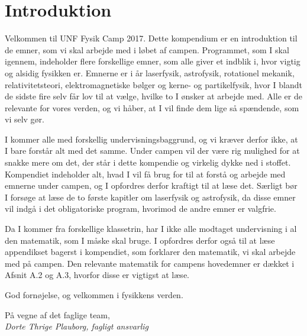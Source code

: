 \chapter{Introduktion}
\label{cha:introduktion}

Velkommen til UNF Fysik Camp 2017. Dette kompendium er en introduktion
til de emner, som vi skal arbejde med i løbet af campen. Programmet,
som I skal igennem, indeholder flere forskellige emner, som alle
giver et indblik i, hvor vigtig og alsidig fysikken er. Emnerne er i år laserfysik, astrofysik, rotationel mekanik, relativitetsteori, elektromagnetiske bølger og kerne- og partikelfysik, hvor I blandt de sidste fire selv får lov til at vælge, hvilke to I ønsker at arbejde med. Alle er de relevante for vores verden, og vi håber, at I
vil finde dem lige så spændende, som vi selv gør.

I kommer alle med forskellig undervisningsbaggrund, og vi kræver
derfor ikke, at I bare forstår alt med det samme. Under campen vil der
være rig mulighed for at snakke mere om det, der står i dette
kompendie og virkelig dykke ned i stoffet. Kompendiet indeholder alt,
hvad I vil få brug for til at forstå og arbejde med emnerne under
campen, og I opfordres derfor kraftigt til at læse det. Særligt bør I
forsøge at læse de to første kapitler om laserfysik og astrofysik,
da disse emner vil indgå i det obligatoriske program, hvorimod de
andre emner er valgfrie.

Da I kommer fra forskellige klassetrin, har I ikke alle modtaget
undervisning i al den matematik, som I måske skal bruge. I opfordres
derfor også til at læse appendikset bagerst i kompendiet, som
forklarer den matematik, vi skal arbejde med på campen. Den relevante matematik for campens hovedemner er dækket i Afsnit A.2 og A.3, hvorfor disse er vigtigst at læse. 

God fornøjelse, og velkommen i fysikkens verden.

\begin{flushright}
På vegne af det faglige team, \\
\textit{Dorte Thrige Plauborg, fagligt ansvarlig } 
\end{flushright}

